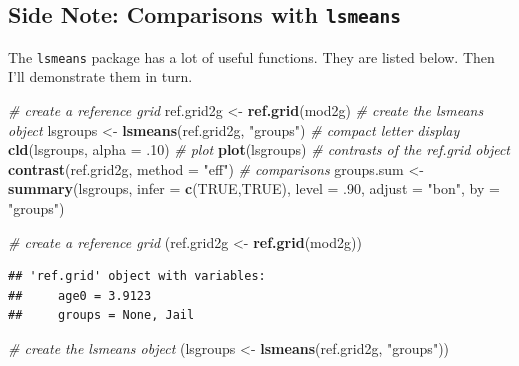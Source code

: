 \documentclass[]{article}
\newenvironment{Shaded}{\begin{snugshade}}{\end{snugshade}}
\newcommand{\KeywordTok}[1]{\textcolor[rgb]{0.13,0.29,0.53}{\textbf{#1}}}
\newcommand{\DataTypeTok}[1]{\textcolor[rgb]{0.13,0.29,0.53}{#1}}
\newcommand{\DecValTok}[1]{\textcolor[rgb]{0.00,0.00,0.81}{#1}}
\newcommand{\StringTok}[1]{\textcolor[rgb]{0.31,0.60,0.02}{#1}}
\newcommand{\CommentTok}[1]{\textcolor[rgb]{0.56,0.35,0.01}{\textit{#1}}}
\newcommand{\OtherTok}[1]{\textcolor[rgb]{0.56,0.35,0.01}{#1}}
\newcommand{\NormalTok}[1]{#1}
\begin{document}
\normalsize  

\subsection{\texorpdfstring{Side Note: Comparisons with
\texttt{lsmeans}}{Side Note: Comparisons with lsmeans}}\label{side-note-comparisons-with-lsmeans}

The \texttt{lsmeans} package has a lot of useful functions. They are
listed below. Then I'll demonstrate them in turn.\\
\small

\begin{Shaded}
\begin{Highlighting}[]
\CommentTok{# create a reference grid}
\NormalTok{ref.grid2g <-}\StringTok{ }\KeywordTok{ref.grid}\NormalTok{(mod2g)}
\CommentTok{# create the lsmeans object}
\NormalTok{lsgroups   <-}\StringTok{ }\KeywordTok{lsmeans}\NormalTok{(ref.grid2g, }\StringTok{"groups"}\NormalTok{)}
\CommentTok{# compact letter display}
\KeywordTok{cld}\NormalTok{(lsgroups, }\DataTypeTok{alpha =}\NormalTok{ .}\DecValTok{10}\NormalTok{)}
\CommentTok{# plot}
\KeywordTok{plot}\NormalTok{(lsgroups)}
\CommentTok{# contrasts of the ref.grid object}
\KeywordTok{contrast}\NormalTok{(ref.grid2g, }\DataTypeTok{method =} \StringTok{"eff"}\NormalTok{)}
\CommentTok{# comparisons}
\NormalTok{groups.sum <-}\StringTok{ }\KeywordTok{summary}\NormalTok{(lsgroups, }\DataTypeTok{infer =} \KeywordTok{c}\NormalTok{(}\OtherTok{TRUE}\NormalTok{,}\OtherTok{TRUE}\NormalTok{), }
                      \DataTypeTok{level =}\NormalTok{ .}\DecValTok{90}\NormalTok{, }\DataTypeTok{adjust =} \StringTok{"bon"}\NormalTok{, }\DataTypeTok{by =} \StringTok{"groups"}\NormalTok{)}
\end{Highlighting}
\end{Shaded}

\begin{Shaded}
\begin{Highlighting}[]
\CommentTok{# create a reference grid}
\NormalTok{(ref.grid2g <-}\StringTok{ }\KeywordTok{ref.grid}\NormalTok{(mod2g))}
\end{Highlighting}
\end{Shaded}

\begin{verbatim}
## 'ref.grid' object with variables:
##     age0 = 3.9123
##     groups = None, Jail
\end{verbatim}

\begin{Shaded}
\begin{Highlighting}[]
\CommentTok{# create the lsmeans object}
\NormalTok{(lsgroups   <-}\StringTok{ }\KeywordTok{lsmeans}\NormalTok{(ref.grid2g, }\StringTok{"groups"}\NormalTok{))}
\end{Highlighting}
\end{Shaded}
\end{document}
